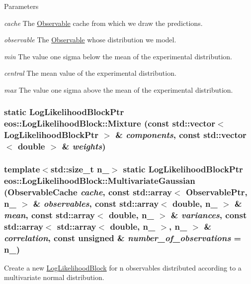 \begin{DoxyParams}{Parameters}
\item[{\em cache}]The \hyperlink{classeos_1_1Observable}{Observable} cache from which we draw the predictions. \item[{\em observable}]The \hyperlink{classeos_1_1Observable}{Observable} whose distribution we model. \item[{\em min}]The value one sigma below the mean of the experimental distribution. \item[{\em central}]The mean value of the experimental distribution. \item[{\em max}]The value one sigma above the mean of the experimental distribution. \end{DoxyParams}
\hypertarget{classeos_1_1LogLikelihoodBlock_a7a47859d5eff2ef0a6b38ef3e70ee1d0}{
\subsubsection[{Mixture}]{\setlength{\rightskip}{0pt plus 5cm}static {\bf LogLikelihoodBlockPtr} eos::LogLikelihoodBlock::Mixture (const std::vector$<$ {\bf LogLikelihoodBlockPtr} $>$ \& {\em components}, \/  const std::vector$<$ double $>$ \& {\em weights})}}
\label{classeos_1_1LogLikelihoodBlock_a7a47859d5eff2ef0a6b38ef3e70ee1d0}
\hypertarget{classeos_1_1LogLikelihoodBlock_a6b124551639991dd21a9e11e9a2d54c6}{
\subsubsection[{MultivariateGaussian}]{\setlength{\rightskip}{0pt plus 5cm}template$<$std::size\_\-t n\_\-$>$ static {\bf LogLikelihoodBlockPtr} eos::LogLikelihoodBlock::MultivariateGaussian ({\bf ObservableCache} {\em cache}, \/  const std::array$<$ {\bf ObservablePtr}, n\_\- $>$ \& {\em observables}, \/  const std::array$<$ double, n\_\- $>$ \& {\em mean}, \/  const std::array$<$ double, n\_\- $>$ \& {\em variances}, \/  const std::array$<$ std::array$<$ double, n\_\- $>$, n\_\- $>$ \& {\em correlation}, \/  const unsigned \& {\em number\_\-of\_\-observations} = {\ttfamily n\_\-})}}
\label{classeos_1_1LogLikelihoodBlock_a6b124551639991dd21a9e11e9a2d54c6}
Create a new \hyperlink{classeos_1_1LogLikelihoodBlock}{LogLikelihoodBlock} for n observables distributed according to a multivariate normal distribution.

